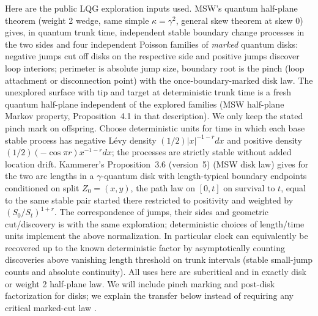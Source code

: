 Here are the public LQG exploration inputs used. MSW's quantum half-plane theorem (weight 2 wedge, same simple \(\kappa=\gamma^2\), general skew theorem at skew 0) gives, in quantum trunk time, independent stable boundary change processes in the two sides and four independent Poisson families of \emph{marked} quantum disks: negative jumps cut off disks on the respective side and positive jumps discover loop interiors; perimeter is absolute jump size, boundary root is the pinch (loop attachment or disconnection point) with the once-boundary-marked disk law.
The unexplored surface with tip and target at deterministic trunk time is a fresh quantum half-plane independent of the explored families (MSW half-plane Markov property, Proposition~4.1 in that description).
We only keep the stated pinch mark on offspring.
Choose deterministic units for time in which each base stable process has negative Lévy density \((1/2)|x|^{-1-r}dx\) and positive density \((1/2)(-\cos\pi r)x^{-1-r}dx\); the processes are strictly stable without added location drift.
Kammerer's Proposition~3.6 (version~5) (MSW disk law) gives for the two arc lengths in a \(\gamma\)-quantum disk with length-typical boundary endpoints conditioned on split \(Z_0=(x,y)\), the path law on \([0,t]\) on survival to \(t\), equal to the same stable pair started there restricted to positivity and weighted by \((S_0/S_t)^{1+r}\).
The correspondence of jumps, their sides and geometric cut/discovery is with the same exploration; deterministic choices of length/time units implement the above normalization.
In particular clock can equivalently be recovered up to the known deterministic factor by asymptotically counting discoveries above vanishing length threshold on trunk intervals (stable small-jump counts and absolute continuity).
All uses here are subcritical and in exactly disk or weight 2 half-plane law.
We will include pinch marking and post-disk factorization for disks; we explain the transfer below instead of requiring any critical marked-cut law \citep[Theorems~1.4--1.5, Section~3.1, Proposition~4.1, Corollary~4.2, and Proposition~4.4]{MSWQuantum}\citep[Proposition~3.6, version~5]{Kammerer}.

